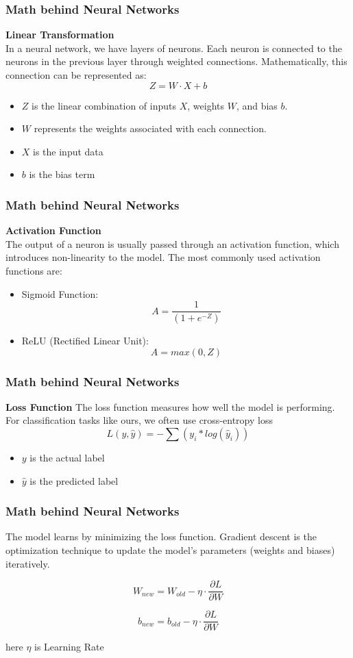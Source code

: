 \documentclass{beamer}
\begin{document}
\begin{frame}
    \frametitle{Math behind Neural Networks}
    \textbf{Linear Transformation}
    \\
    In a neural network, we have layers of neurons. Each neuron is connected to the neurons in the previous layer through weighted connections. Mathematically, this connection can be represented as:
    \[Z  = W \cdot X + b\]
    \begin{itemize}
        \item \(Z\) is the linear combination of inputs \(X\), weights \(W\), and bias \(b\).
        \item  \(W\)  represents the weights associated with each connection.
        \item \(X\) is the input data
        \item \(b\) is the bias term
    \end{itemize}   
\end{frame}

\begin{frame}
    \frametitle{Math behind Neural Networks}
    \textbf{Activation Function}
    \\
    The output of a neuron is usually passed through an activation function, which introduces non-linearity to the model. The most commonly used activation functions are:
    \\
    \begin{itemize}
        \item Sigmoid Function:
        \[A= \frac{1}{(1 + e^{-Z})}\]
        \item ReLU (Rectified Linear Unit):
        \[A=max(0, Z)\]
    \end{itemize}
\end{frame}

\begin{frame}
    \frametitle{Math behind Neural Networks}
    \textbf{Loss Function}
    The loss function measures how well the model is performing. For classification tasks like ours, we often use cross-entropy loss
    \[L(y, \hat{y}) = -\sum(y_i * log(\hat{y}_i))\]
    \begin{itemize}
        \item \(y\) is the actual label
        \item \(\hat{y}\) is the predicted label
    \end{itemize}
\end{frame}

\begin{frame}
    \frametitle{Math behind Neural Networks}
        The model learns by minimizing the loss function. Gradient descent is the optimization technique to update the model’s parameters (weights and biases) iteratively.

        \[W_{new} = W_{old} - \eta \cdot \frac{\partial L}{\partial W}\]

        \[b_{new} = b_{old}-\eta \cdot \frac{\partial L}{\partial W}\]

        here \(\eta\) is Learning Rate
\end{frame}
\end{document}
